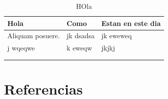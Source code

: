 \documentclass[11pt]{article}
\begin{document}
\begin{table}[htbp]
\centering
\begin{tabular}{|l|l|l|}
\hline
Hola & Como & Estan en este dia\\
\hline
Aliquam posuere. & jk dsadsa & jk eweweq\\
j wqeqwe & k eweqw & jkjkj\\
 &  & \\
 &  & \\
\hline
\end{tabular}
\caption{HOla}

\end{table}

\section{Referencias}
\label{sec:org4fc01c5}
\printbibliography[heading=none]
\end{document}
